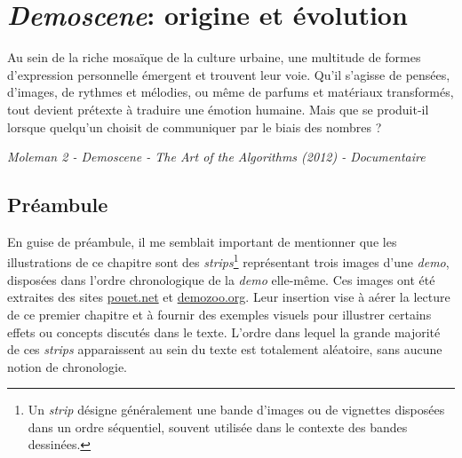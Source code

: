 \chapter{\textit{Demoscene}: origine et évolution}
\setlength{\epigraphwidth}{0.7\linewidth} %

\epigraph{Au sein de la riche mosaïque de la culture urbaine, une multitude de formes d'expression personnelle émergent et trouvent leur voie. Qu'il s'agisse de pensées, d'images, de rythmes et mélodies, ou même de parfums et matériaux transformés, tout devient prétexte à traduire une émotion humaine. Mais que se produit-il lorsque quelqu'un choisit de 
communiquer par le biais des nombres ?}{\textit{Moleman 2 - Demoscene - The Art of the Algorithms (2012) - Documentaire}}



\section{Préambule}

En guise de préambule, il me semblait important de mentionner que les illustrations de ce chapitre sont des \textit{strips}\footnote{Un \textit{strip} désigne généralement une bande d'images ou de vignettes disposées dans un ordre séquentiel, souvent utilisée dans le contexte des bandes dessinées.} représentant trois images d'une \textit{demo}, disposées dans l'ordre chronologique de la \textit{demo} elle-même. Ces images ont été extraites des sites \href{https://pouet.net}{pouet.net} et \href{https://demozoo.org}{demozoo.org}. Leur insertion vise à aérer la lecture de ce premier chapitre et à fournir des exemples visuels pour illustrer certains effets ou concepts discutés dans le texte. L'ordre dans lequel la grande majorité de ces \textit{strips} apparaissent au sein du texte est totalement aléatoire, sans aucune notion de chronologie.

